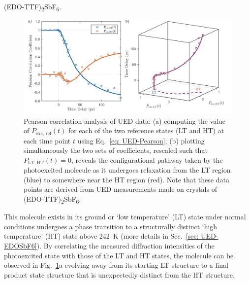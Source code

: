 (EDO-TTF)\textsubscript{2}SbF\textsubscript{6}.
%
\begin{figure}[t!]
  \centering
  \includegraphics[width = \textwidth]{Figures/fig_UED_pearson.pdf}
  \caption[Pearson correlation analysis of UED data.]{
  Pearson correlation analysis of UED data:
  (a) computing the value of $P_\text{exc, ref}(t)$ for each of the two reference states (LT and HT)
  at each time point $t$ using Eq.~\eqref{eq: UED-Pearson};
  (b) plotting simultaneously the two sets of coefficients, rescaled such that $P_\mathrm{LT, HT}(t) = 0$,
  reveals the configurational pathway taken by the photoexcited molecule as it undergoes relaxation
  from the LT region (blue) to somewhere near the HT region (red).
  Note that these data points are derived from UED measurements made on
  crystals of (EDO-TTF)\textsubscript{2}SbF\textsubscript{6}.
  }
  \label{fig: UED-pearson}
\end{figure}
%
This molecule exists in its ground or `low temperature' (LT) state under normal conditions
undergoes a phase transition to a structurally distinct `high temperature' (HT) state
above 242~K (more details in Sec.~\ref{sec: UED-EDOSbF6}).
By correlating the measured diffraction intensities of the photoexcited state with those
of the LT and HT states, the molecule can be observed in Fig.~\ref{fig: UED-pearson}a
evolving away from its starting LT structure to a final product state structure
that is unexpectedly distinct from the HT structure.

